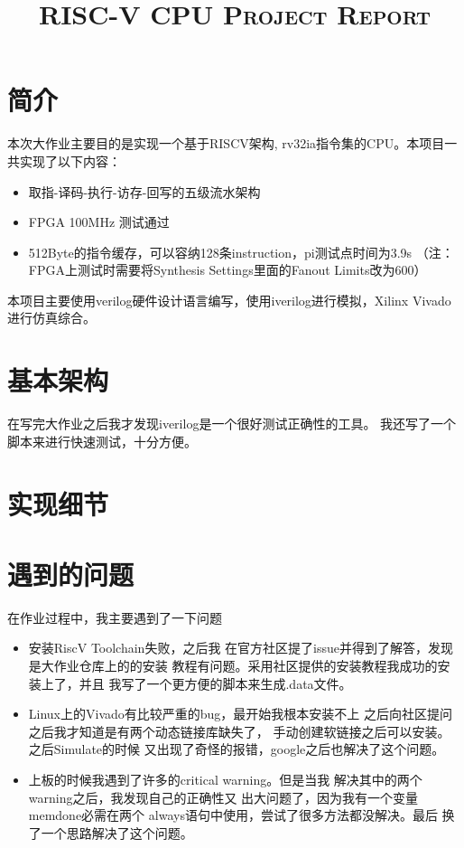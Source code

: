 
\title{\Huge\textsc{RISC-V CPU Project Report}}

\maketitle
 
\section{简介}
本次大作业主要目的是实现一个基于RISCV架构, rv32ia指令集的CPU。本项目一共实现了以下内容：
\begin{itemize}
		\item 取指-译码-执行-访存-回写的五级流水架构
		\item FPGA 100MHz 测试通过
		\item 512Byte的指令缓存，可以容纳128条instruction，pi测试点时间为3.9s
（注：FPGA上测试时需要将Synthesis Settings里面的Fanout Limits改为600）
\end{itemize}

本项目主要使用verilog硬件设计语言编写，使用iverilog进行模拟，Xilinx Vivado进行仿真综合。
\section{基本架构}
		在写完大作业之后我才发现iverilog是一个很好测试正确性的工具。
		我还写了一个脚本来进行快速测试，十分方便。
\section{实现细节}
\section{遇到的问题}
在作业过程中，我主要遇到了一下问题
\begin{itemize}
		\item 安装RiscV Toolchain失败，之后我
				在官方社区提了issue并得到了解答，发现是大作业仓库上的的安装
				教程有问题。采用社区提供的安装教程我成功的安装上了，并且
				我写了一个更方便的脚本来生成.data文件。
		\item Linux上的Vivado有比较严重的bug，最开始我根本安装不上
				之后向社区提问之后我才知道是有两个动态链接库缺失了，
				手动创建软链接之后可以安装。之后Simulate的时候
				又出现了奇怪的报错，google之后也解决了这个问题。
		\item 上板的时候我遇到了许多的critical warning。但是当我
				解决其中的两个warning之后，我发现自己的正确性又
				出大问题了，因为我有一个变量memdone必需在两个
				always语句中使用，尝试了很多方法都没解决。最后
				换了一个思路解决了这个问题。
\end{itemize}
